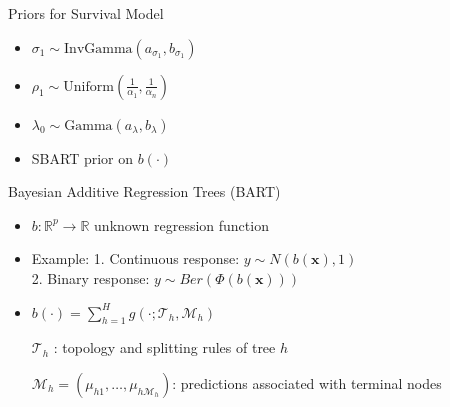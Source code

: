 \documentclass{beamer}
\begin{document}
\begin{frame}{Priors for Survival Model}
\protect\hypertarget{model-using-sbart}{}
\begin{itemize}
  \vfill \item $\sigma_1 \sim \text{InvGamma}(a_{\sigma_1},b_{\sigma_1})$
  \vfill \item  $\rho_1 \sim \text{Uniform}(\frac{1}{\alpha_1},\frac{1}{\alpha_n})$ 
 \vfill \item \(\lambda_0 \sim \text{Gamma}(a_{\lambda},b_{\lambda})\)  
  

 

    \vfill \item  SBART prior on $b(\cdot)$


\end{itemize}    


\end{frame}
\begin{frame}{Bayesian Additive Regression Trees (BART)}
\protect\hypertarget{review-of-bayesian-additive-regression-trees-bart}{}
\begin{itemize}

\vfill \item
  \(b:\mathbb{R}^p \to \mathbb{R}\) unknown regression function
  \vfill \item
  Example: 1. Continuous response: $y \sim N(b(\mathbf{x}),1)$
   \\ 2. Binary response: $y \sim Ber(\Phi(b(\mathbf{x})))$
\vfill \item
  \(b(\cdot) = \sum_{h=1}^{H}g(\cdot; \mathcal{T}_h, \mathcal{M}_h)\)

    \(\mathcal{T}_h\) : topology and splitting rules of tree \(h\)

    \(\mathcal{M}_h = (\mu_{h1}, \dots, \mu_{h\mathcal{M}_h})\): predictions associated with terminal nodes
\end{itemize}
\end{frame}
\end{document}
